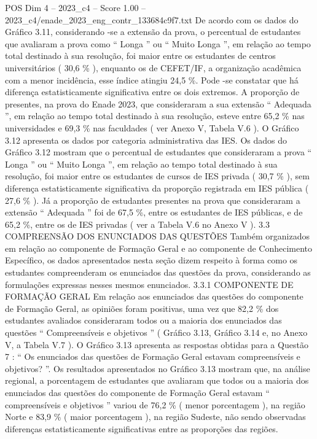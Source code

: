 \begin{textsample}{POS Dim 4 – 2023\_c4 – Score 1.00 – 2023\_c4/enade\_2023\_eng\_contr\_133684c9f7.txt}
De acordo com os dados do Gráfico 3.11, considerando -se a extensão da prova, o percentual de estudantes que avaliaram a prova como “ Longa ” ou “ Muito Longa ”, em relação ao tempo total destinado à sua resolução, foi maior entre os estudantes de centros universitários ( 30,6 \% ), enquanto os de CEFET/IF, a organização acadêmica com a menor incidência, esse índice atingiu 24,5 \%.
Pode -se constatar que há diferença estatisticamente significativa entre os dois extremos.
A proporção de presentes, na prova do Enade 2023, que consideraram a sua extensão “ Adequada ”, em relação ao tempo total destinado à sua resolução, esteve entre 65,2 \% nas universidades e 69,3 \% nas faculdades ( ver Anexo V, Tabela V.6 ).
O Gráfico 3.12 apresenta os dados por categoria administrativa das IES.
Os dados do Gráfico 3.12 mostram que o percentual de estudantes que consideraram a prova “ Longa ” ou “ Muito Longa ”, em relação ao tempo total destinado à sua resolução, foi maior entre os estudantes de cursos de IES privada ( 30,7 \% ), sem diferença estatisticamente significativa da proporção registrada em IES pública ( 27,6 \% ).
Já a proporção de estudantes presentes na prova que consideraram a extensão “ Adequada ” foi de 67,5 \%, entre os estudantes de IES públicas, e de 65,2 \%, entre os de IES privadas ( ver a Tabela V.6 no Anexo V ). 3.3 COMPREENSÃO DOS ENUNCIADOS DAS QUESTÕES Também organizados em relação ao componente de Formação Geral e ao componente de Conhecimento Específico, os dados apresentados nesta seção dizem respeito à forma como os estudantes compreenderam os enunciados das questões da prova, considerando as formulações expressas nesses mesmos enunciados. 3.3.1 COMPONENTE DE FORMAÇÃO GERAL Em relação aos enunciados das questões do componente de Formação Geral, as opiniões foram positivas, uma vez que 82,2 \% dos estudantes avaliados consideraram todos ou a maioria dos enunciados das questões “ Compreensíveis e objetivos ” ( Gráfico 3.13, Gráfico 3.14 e, no Anexo V, a Tabela V.7 ).
O Gráfico 3.13 apresenta as respostas obtidas para a Questão 7 : “ Os enunciados das questões de Formação Geral estavam compreensíveis e objetivos? ”.
Os resultados apresentados no Gráfico 3.13 mostram que, na análise regional, a porcentagem de estudantes que avaliaram que todos ou a maioria dos enunciados das questões do componente de Formação Geral estavam “ compreensíveis e objetivos ” variou de 76,2 \% ( menor porcentagem ), na região Norte e 83,9 \% ( maior porcentagem ), na região Sudeste, não sendo observadas diferenças estatisticamente significativas entre as proporções das regiões.

\end{textsample}

